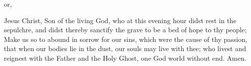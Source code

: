 \begin{multicols}{2}
\begin{inhead}
	or,
\end{inhead}
 Jesus Christ, Son of the living God, who at this evening hour didst rest in the sepulchre, and didst thereby sanctify the grave to be a bed of hope to thy people; Make us so to abound in sorrow for our sins, which were the cause of thy passion, that when our bodies lie in the dust, our souls may live with thee; who livest and reignest with the Father and the Holy Ghost, one God world without end. Amen.



\end{multicols}
